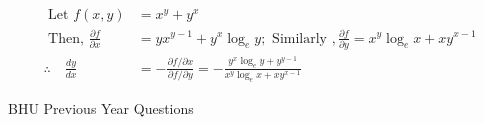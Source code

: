 \begin{enumerate}
\begin{answer}
	\begin{align*}
		\text { Let } f(x, y)&=x^{y}+y^{x}\\
		\text { Then, } \frac{\partial f}{\partial x}&=y x^{y-1}+y^{x} \log _{e} y ; \text { Similarly }, \frac{\partial f}{\partial y}=x^{y} \log _{e} x+x y^{x-1}\\
		\therefore \quad \frac{d y}{d x}&=-\frac{\partial f / \partial x}{\partial f / \partial y}=-\frac{y^{x} \log _{e} y+y^{y-1}}{x^{y} \log _{e} x+x y^{x-1}}
	\end{align*}
	
\end{answer}

\end{enumerate}

\newpage
\begin{abox}
	BHU Previous Year Questions
\end{abox}
\section*{}


